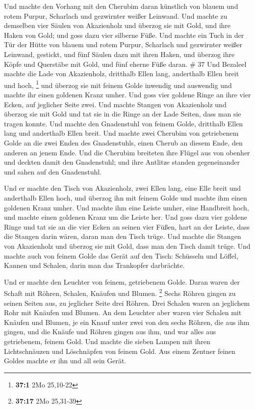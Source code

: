  Und machte den Vorhang mit den Cherubim daran künstlich
von blauem und rotem Purpur, Scharlach und gezwirnter weißer Leinwand.
 Und machte zu demselben vier Säulen von Akazienholz und
überzog sie mit Gold, und ihre Haken von Gold; und goss dazu vier
silberne Füße.  Und machte ein Tuch in der Tür der Hütte
von blauem und rotem Purpur, Scharlach und gezwirnter weißer Leinwand,
gestickt,  und fünf Säulen dazu mit ihren Haken, und
überzog ihre Köpfe und Querstäbe mit Gold, und fünf eherne Füße daran.
\# 37  Und Bezaleel machte die Lade von Akazienholz,
dritthalb Ellen lang, anderthalb Ellen breit und hoch, \footnote{\textbf{37:1}
  2Mo 25,10-22}  und überzog sie mit feinem Golde inwendig
und auswendig und machte ihr einen goldenen Kranz umher. 
Und goss vier goldene Ringe an ihre vier Ecken, auf jeglicher Seite
zwei.  Und machte Stangen von Akazienholz und überzog sie
mit Gold  und tat sie in die Ringe an der Lade Seiten,
dass man sie tragen konnte.  Und machte den Gnadenstuhl
von feinem Golde, dritthalb Ellen lang und anderthalb Ellen breit.
 Und machte zwei Cherubim von getriebenem Golde an die
zwei Enden des Gnadenstuhls,  einen Cherub an diesem Ende,
den anderen an jenem Ende.  Und die Cherubim breiteten
ihre Flügel aus von obenher und deckten damit den Gnadenstuhl; und ihre
Antlitze standen gegeneinander und sahen auf den Gnadenstuhl.

 Und er machte den Tisch von Akazienholz, zwei Ellen
lang, eine Elle breit und anderthalb Ellen hoch,  und
überzog ihn mit feinem Golde und machte ihm einen goldenen Kranz umher.
 Und machte ihm eine Leiste umher, eine Handbreit hoch,
und machte einen goldenen Kranz um die Leiste her.  Und
goss dazu vier goldene Ringe und tat sie an die vier Ecken an seinen
vier Füßen,  hart an der Leiste, dass die Stangen darin
wären, daran man den Tisch trüge.  Und machte die Stangen
von Akazienholz und überzog sie mit Gold, dass man den Tisch damit
trüge.  Und machte auch von feinem Golde das Gerät auf
den Tisch: Schüsseln und Löffel, Kannen und Schalen, darin man das
Trankopfer darbrächte.

 Und er machte den Leuchter von feinem, getriebenem
Golde. Daran waren der Schaft mit Röhren, Schalen, Knäufen und Blumen.
\footnote{\textbf{37:17} 2Mo 25,31-39}  Sechs Röhren
gingen zu seinen Seiten aus, zu jeglicher Seite drei Röhren.
 Drei Schalen waren an jeglichem Rohr mit Knäufen und
Blumen.  An dem Leuchter aber waren vier Schalen mit
Knäufen und Blumen,  je ein Knauf unter zwei von den
sechs Röhren, die aus ihm gingen,  und die Knäufe und
Röhren gingen aus ihm, und war alles aus getriebenem, feinem Gold.
 Und machte die sieben Lampen mit ihren Lichtschnäuzen
und Löschnäpfen von feinem Gold.  Aus einem Zentner
feinen Goldes machte er ihn und all sein Gerät.

